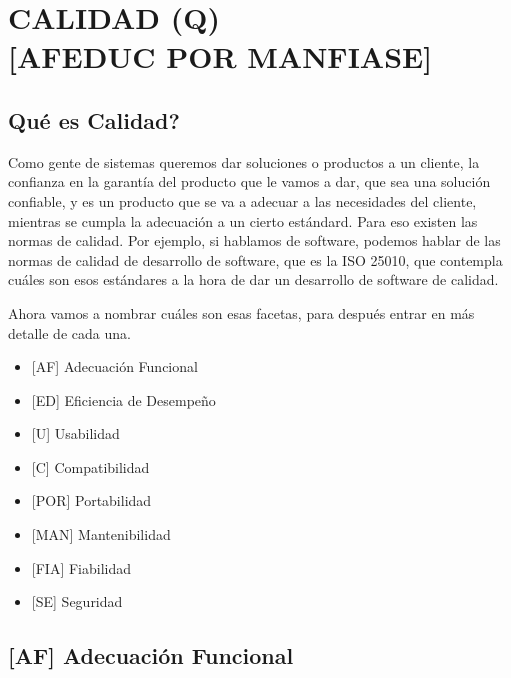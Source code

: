 
\twocolumn
\hypertarget{calidad-q}{%
\section{CALIDAD (Q) \\ {[}AFEDUC POR MANFIASE{]}}\label{calidad-q}}


\subsection{Qué es Calidad?}

Como gente de sistemas queremos dar soluciones o
productos a un cliente, la confianza en la garantía del producto que le
vamos a dar, que sea una solución confiable, y es un producto que se va
a adecuar a las necesidades del cliente, mientras se cumpla la
adecuación a un cierto estándard. Para eso existen las normas de
calidad. Por ejemplo, si hablamos de software, podemos hablar de las
normas de calidad de desarrollo de software, que es la ISO 25010, que
contempla cuáles son esos estándares a la hora de dar un desarrollo de
software de calidad.

Ahora vamos a nombrar cuáles son esas facetas, para después entrar en
más detalle de cada una.

\begin{itemize}
  \setlength\itemsep{-1em}
\item
  {[}AF{]}
  Adecuación Funcional
\item
  {[}ED{]}
  Eficiencia de Desempeño
\item
  {[}U{]}
  Usabilidad
\item
  {[}C{]}
  Compatibilidad
\item
  {[}POR{]}
  Portabilidad
\item
  {[}MAN{]}
  Mantenibilidad
\item
  {[}FIA{]}
  Fiabilidad
\item
  {[}SE{]}
  Seguridad
\end{itemize}


\hypertarget{adecuaciuxf3n-funcional-af}{%
\subsection{%
{[}AF{]}
Adecuación Funcional
}\label{adecuaciuxf3n-funcional-af}}

